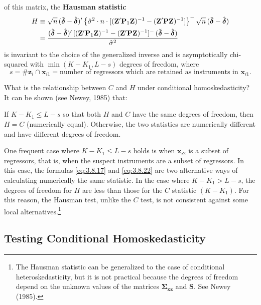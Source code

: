 of this matrix, the \textbf{Hausman statistic}
\begin{align}
  H &\equiv \sqrt{n}\,(\tilde{\boldsymbol{\delta}} - \hat{\boldsymbol{\delta}})'\,
  \bigl\{\hat{\sigma}^2 \cdot n \cdot
  [(\mathbf{Z}'\mathbf{P}_1\mathbf{Z})^{-1}
  - (\mathbf{Z}'\mathbf{P}\mathbf{Z})^{-1}]\bigr\}^{-}\,
  \sqrt{n}\,(\tilde{\boldsymbol{\delta}} - \hat{\boldsymbol{\delta}}) \notag \\
  &= \frac{(\tilde{\boldsymbol{\delta}} - \hat{\boldsymbol{\delta}})'\,
  [(\mathbf{Z}'\mathbf{P}_1\mathbf{Z})^{-1}
  - (\mathbf{Z}'\mathbf{P}\mathbf{Z})^{-1}]^{-}\,
  (\tilde{\boldsymbol{\delta}} - \hat{\boldsymbol{\delta}})}{\hat{\sigma}^2}
  \label{eq:3.8.22}
\end{align}
is invariant to the choice of the generalized inverse and is asymptotically chi-squared
with $\min(K - K_1, L - s)$ degrees of freedom, where
\[
  s = \#\mathbf{z}_i \cap \mathbf{x}_{i1}
  = \text{number of regressors which are retained as instruments in } \mathbf{x}_{i1}.
\]

What is the relationship between $C$ and $H$ under conditional homoskedasticity?
It can be shown (see Newey, 1985) that:

If $K - K_1 \leq L - s$ so that both $H$ and $C$ have the same degrees of freedom, then
$H = C$ (numerically equal).  Otherwise, the two statistics are numerically different
and have different degrees of freedom.

One frequent case where $K - K_1 \leq L - s$ holds is when $\mathbf{x}_{i2}$ is a subset of
regressors, that is, when the suspect instruments are a subset of regressors.  In this case,
the formulas \eqref{eq:3.8.17} and \eqref{eq:3.8.22} are two alternative ways of calculating
numerically the same statistic.  In the case where $K - K_1 > L - s$, the degrees of freedom
for $H$ are less than those for the $C$ statistic $(K - K_1)$.  For this reason, the Hausman
test, unlike the $C$ test, is not consistent against some local alternatives.\footnote{The
Hausman statistic can be generalized to the case of conditional heteroskedasticity, but it
is not practical because the degrees of freedom depend on the unknown values of the
matrices $\boldsymbol{\Sigma}_{\mathbf{xz}}$ and $\mathbf{S}$.  See Newey (1985).}

\subsection*{Testing Conditional Homoskedasticity}

